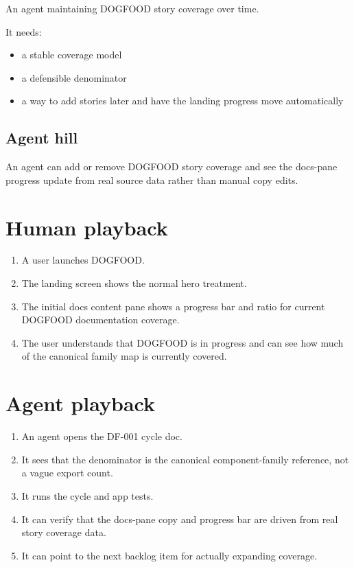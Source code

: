 An agent maintaining DOGFOOD story coverage over time.

It needs:

\begin{itemize}
\tightlist
\item
  a stable coverage model
\item
  a defensible denominator
\item
  a way to add stories later and have the landing progress move automatically
\end{itemize}

\subsection{Agent hill}\label{record-064-agent-hill}

An agent can add or remove DOGFOOD story coverage and see the docs-pane progress update from real source data rather than manual copy edits.

\section{Human playback}\label{record-064-human-playback}

\begin{enumerate}
\def\labelenumi{\arabic{enumi}.}
\tightlist
\item
  A user launches DOGFOOD.
\item
  The landing screen shows the normal hero treatment.
\item
  The initial docs content pane shows a progress bar and ratio for current DOGFOOD documentation coverage.
\item
  The user understands that DOGFOOD is in progress and can see how much of the canonical family map is currently covered.
\end{enumerate}

\section{Agent playback}\label{record-064-agent-playback}

\begin{enumerate}
\def\labelenumi{\arabic{enumi}.}
\tightlist
\item
  An agent opens the DF-001 cycle doc.
\item
  It sees that the denominator is the canonical component-family reference, not a vague export count.
\item
  It runs the cycle and app tests.
\item
  It can verify that the docs-pane copy and progress bar are driven from real story coverage data.
\item
  It can point to the next backlog item for actually expanding coverage.
\end{enumerate}

